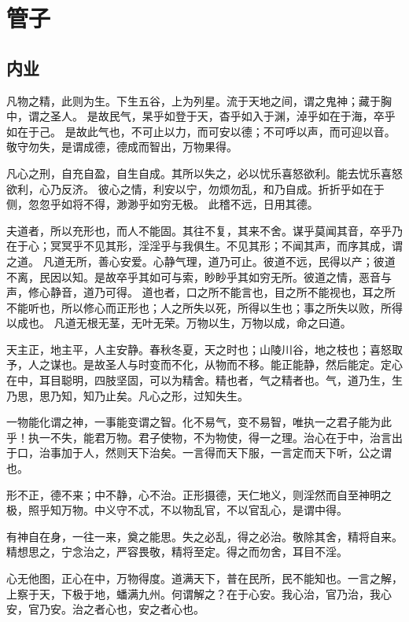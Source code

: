 \section{管子}

\subsection{内业}

凡物之精，此则为生。下生五谷，上为列星。流于天地之间，谓之鬼神；藏于胸中，谓之圣人。
是故民气，杲乎如登于天，杳乎如入于渊，淖乎如在于海，卒乎如在于己。
是故此气也，不可止以力，而可安以德；不可呼以声，而可迎以音。敬守勿失，是谓成德，德成而智出，万物果得。

凡心之刑，自充自盈，自生自成。其所以失之，必以忧乐喜怒欲利。能去忧乐喜怒欲利，心乃反济。
彼心之情，利安以宁，勿烦勿乱，和乃自成。折折乎如在于侧，忽忽乎如将不得，渺渺乎如穷无极。
此稽不远，日用其德。

夫道者，所以充形也，而人不能固。其往不复，其来不舍。谋乎莫闻其音，卒乎乃在于心；冥冥乎不见其形，淫淫乎与我俱生。不见其形；不闻其声，而序其成，谓之道。
凡道无所，善心安爱。心静气理，道乃可止。彼道不远，民得以产；彼道不离，民因以知。是故卒乎其如可与索，眇眇乎其如穷无所。彼道之情，恶音与声，修心静音，道乃可得。
道也者，口之所不能言也，目之所不能视也，耳之所不能听也，所以修心而正形也；人之所失以死，所得以生也；事之所失以败，所得以成也。
凡道无根无茎，无叶无荣。万物以生，万物以成，命之曰道。

天主正，地主平，人主安静。春秋冬夏，天之时也；山陵川谷，地之枝也；喜怒取予，人之谋也。是故圣人与时变而不化，从物而不移。能正能静，然后能定。定心在中，耳目聪明，四肢坚固，可以为精舍。精也者，气之精者也。气，道乃生，生乃思，思乃知，知乃止矣。凡心之形，过知失生。

一物能化谓之神，一事能变谓之智。化不易气，变不易智，唯执一之君子能为此乎！执一不失，能君万物。君子使物，不为物使，得一之理。治心在于中，治言出于口，治事加于人，然则天下治矣。一言得而天下服，一言定而天下听，公之谓也。

形不正，德不来；中不静，心不治。正形摄德，天仁地义，则淫然而自至神明之极，照乎知万物。中义守不忒，不以物乱官，不以官乱心，是谓中得。

有神自在身，一往一来，奠之能思。失之必乱，得之必治。敬除其舍，精将自来。精想思之，宁念治之，严容畏敬，精将至定。得之而勿舍，耳目不淫。

心无他图，正心在中，万物得度。道满天下，普在民所，民不能知也。一言之解，上察于天，下极于地，蟠满九州。何谓解之？在于心安。我心治，官乃治，我心安，官乃安。治之者心也，安之者心也。

